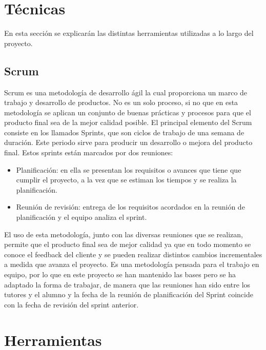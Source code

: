 


\section{Técnicas}
En esta sección se explicarán las distintas herramientas utilizadas a lo largo del proyecto.

\subsection{Scrum}
Scrum es una metodología de desarrollo ágil la cual proporciona un marco de trabajo y desarrollo de productos. No es un solo proceso, si no que en esta metodología se aplican un conjunto de buenas prácticas y procesos para que el producto final sea de la mejor calidad posible.
El principal elemento del Scrum consiste en los llamados Sprints, que son ciclos de trabajo de una semana de duración. Este periodo sirve para producir un desarrollo o mejora del producto final. Estos sprints están marcados por dos reuniones:
\begin{itemize}
	\item Planificación: en ella se presentan los requisitos o avances que tiene que cumplir el proyecto, a la vez que se estiman los tiempos y se realiza la planificación.
	\item Reunión de revisión: entrega de los requisitos acordados en la reunión de planificación y el equipo analiza el sprint.
\end{itemize}
El uso de esta metodología, junto con las diversas reuniones que se realizan, permite que el producto final sea de mejor calidad ya que en todo momento se conoce el feedback del cliente y se pueden realizar distintos cambios incrementales a medida que avanza el proyecto.
Es una metodología pensada para el trabajo en equipo, por lo que en este proyecto se han mantenido las bases pero se ha adaptado la forma de trabajar, de manera que las reuniones han sido entre los tutores y el alumno y la fecha de la reunión de planificación del Sprint coincide con la fecha de revisión del sprint anterior.



\section{Herramientas}


